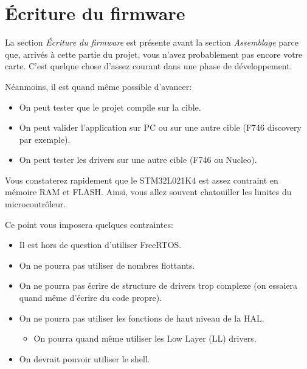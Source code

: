 \documentclass[12pt,%
addpoints,%
]{exam}
\begin{document}
\newpage

\section{Écriture du firmware}
La section \emph{Écriture du firmware} est présente avant la section \emph{Assemblage} parce que, arrivés à cette partie du projet, vous n'avez probablement pas encore votre carte.
C'est quelque chose d'assez courant dans une phase de développement.

Néanmoins, il est quand même possible d'avancer:
\begin{itemize}
	\item On peut tester que le projet compile sur la cible.
	\item On peut valider l'application sur PC ou sur une autre cible (F746 discovery par exemple).
	\item On peut tester les drivers sur une autre cible (F746 ou Nucleo).\\
\end{itemize}

Vous constaterez rapidement que le STM32L021K4 est assez contraint en mémoire RAM et FLASH. 
Ainsi, vous allez souvent chatouiller les limites du microcontrôleur.

Ce point vous imposera quelques contraintes:
\begin{itemize}
	\item Il est hors de question d'utiliser FreeRTOS.
	\item On ne pourra pas utiliser de nombres flottants.
	\item On ne pourra pas écrire de structure de drivers trop complexe (on essaiera quand même d'écrire du code propre).
	\item On ne pourra pas utiliser les fonctions de haut niveau de la HAL.
		\begin{itemize}
			\item On pourra quand même utiliser les Low Layer (LL) drivers.
		\end{itemize}
	\item On devrait pouvoir utiliser le shell. %
\end{itemize}

\newpage
\end{document}
